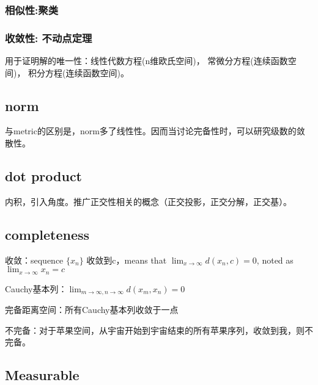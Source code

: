 \documentclass[UTF8]{../../09-Mathematics}
\begin{document}
\subsubsection{相似性:聚类}



\subsubsection{收敛性: 不动点定理}

用于证明解的唯一性：线性代数方程(n维欧氏空间)， 常微分方程(连续函数空间)， 积分方程(连续函数空间)。


\subsection{norm}

与metric的区别是，norm多了线性性。因而当讨论完备性时，可以研究级数的敛散性。




\subsection{dot product}

内积，引入角度。推广正交性相关的概念（正交投影，正交分解，正交基）。


\subsection{completeness}

\begin{definition}
    收敛：sequence $\{ x_n \}$ 收敛到c，means that $\lim_{x \to \infty} d(x_n, c) = 0$, noted as $\lim_{x \to \infty} x_n = c $
\end{definition}

\begin{definition}
    Cauchy基本列：$\lim_{m \to \infty,n \to \infty}d(x_m, x_n)=0  $
\end{definition}

\begin{definition}
    完备距离空间：所有Cauchy基本列收敛于一点
\end{definition}

\begin{definition}
  不完备：对于苹果空间，从宇宙开始到宇宙结束的所有苹果序列，收敛到我，则不完备。
\end{definition}



\subsection{Measurable}
\end{document}
